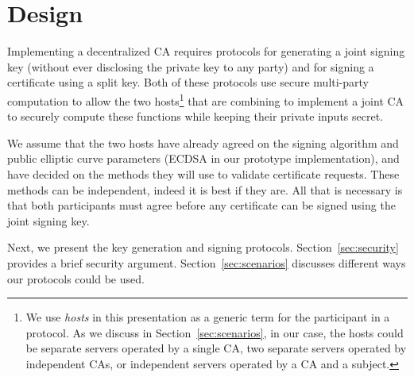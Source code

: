 \section{Design}  \label{sec:design}


Implementing a decentralized CA requires protocols for generating a joint signing key (without ever disclosing the private key to any party) and for signing a certificate using a split key. Both of these protocols use secure multi-party computation to allow the two hosts\footnote{We use \emph{hosts} in this presentation as a generic term for the participant in a protocol. As we discuss in Section~\ref{sec:scenarios}, in our case, the hosts could be separate servers operated by a single CA, two separate servers operated by independent CAs, or independent servers operated by a CA and a subject.} that are combining to implement a joint CA to securely compute these functions while keeping their private inputs secret.

We assume that the two hosts have already agreed on the signing algorithm and public elliptic curve parameters (ECDSA in our prototype implementation), and have decided on the methods they will use to validate certificate requests. These methods can be independent, indeed it is best if they are. All that is necessary is that both participants must agree before any certificate can be signed using the joint signing key.

Next, we present the key generation and signing protocols. Section~\ref{sec:security} provides a brief security argument. Section~\ref{sec:scenarios} discusses different ways our protocols could be used.





